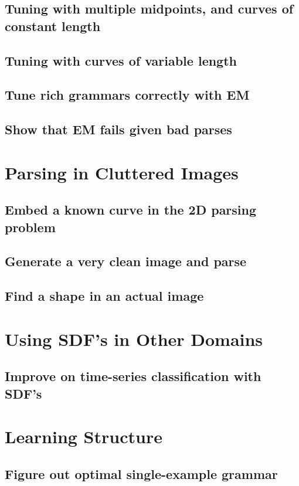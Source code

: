 \documentclass{book}
\begin{document}
\subsection{Tuning with multiple midpoints, and curves of constant length}
\label{sec-1_4_2}
\subsection{Tuning with curves of variable length}
\label{sec-1_4_3}
\subsection{Tune rich grammars correctly with EM}
\label{sec-1_4_4}
\subsection{Show that EM fails given bad parses}
\label{sec-1_4_5}
\section{Parsing in Cluttered Images}
\label{sec-1_5}
\subsection{Embed a known curve in the 2D parsing problem}
\label{sec-1_5_1}
\subsection{Generate a very clean image and parse}
\label{sec-1_5_2}
\subsection{Find a shape in an actual image}
\label{sec-1_5_3}
\section{Using SDF's in Other Domains}
\label{sec-1_6}
\subsection{Improve on time-series classification with SDF's}
\label{sec-1_6_1}
\section{Learning Structure}
\label{sec-1_7}
\subsection{Figure out optimal single-example grammar}
\label{sec-1_7_1}
\end{document}
